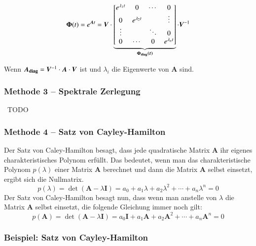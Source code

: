 \begin{minipage}[c]{0.6\columnwidth}
    $$ \bm{\Phi}(t) = e^{\bm{A} t} = \bm{V} \cdot \underbrace{ 
    \begin{bmatrix*} 
        e^{\lambda_1 t} & 0                 & \cdots        & 0      \\
        0               & e^{\lambda_2 t}   &               & \vdots \\
        \vdots          &                   & \ddots        & 0      \\
        0               & \cdots            & 0             & e^{\lambda_n t}
\end{bmatrix*}}_{\bm{\Phi_{\rm diag}(t)}} \cdot \bm{V}^{-1} $$
\end{minipage}
\hfill
\begin{minipage}[c]{0.36\columnwidth}
    Wenn $\bm{A_{\rm diag}} = \bm{V}^{-1} \cdot \bm{A} \cdot \bm{V}$ ist und $\lambda_i$ die Eigenwerte von $\bm{A}$ sind.
\end{minipage}


\subsubsection{Methode 3 -- Spektrale Zerlegung}

\textrightarrow\ TODO


\subsubsection{Methode 4 -- Satz von Cayley-Hamilton}

Der Satz von Caley-Hamilton besagt, dass jede quadratische Matrix $\bm{A}$ ihr eigenes charakteristisches Polynom erfüllt. Das bedeutet, wenn man das
charakteristische Polynom $p(\lambda)$ einer Matrix $\bm{A}$ berechnet und dann die Matrix $\bm{A}$ selbst einsetzt, ergibt sich die Nullmatrix.
$$ p(\lambda) = \det(\bm{A} - \lambda \bm{I}) = a_0 + a_1\lambda + a_2\lambda^2 + \cdots + a_n\lambda^n = 0 $$
Der Satz von Caley-Hamilton besagt nun, dass wenn man anstelle von $\lambda$ die Matrix $\bm{A}$ selbst einsetzt, die folgende Gleichung immer noch gilt:
$$ p(\bm{A}) = \det(\bm{A} - \lambda\bm{I}) = a_0 \bm{I} + a_1\bm{A} + a_2\bm{A}^2 + \cdots + a_n\bm{A}^n = 0 $$

\subsubsection*{Beispiel: Satz von Cayley-Hamilton}

